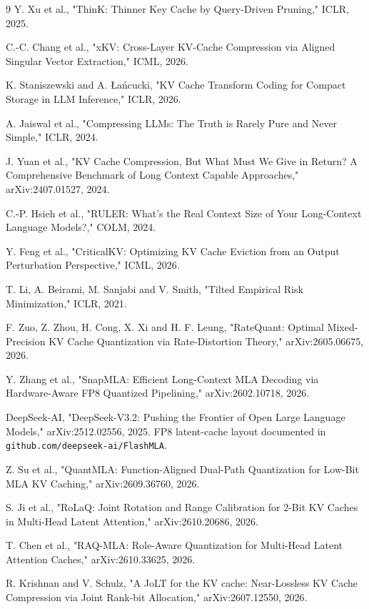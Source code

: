 \documentclass[10pt]{article}
\begin{document}
\begin{thebibliography}{9}
 Y. Xu et al., "ThinK: Thinner Key Cache by Query-Driven Pruning," ICLR, 2025.

 C.-C. Chang et al., "xKV: Cross-Layer KV-Cache Compression via Aligned Singular Vector Extraction," ICML, 2026.

 K. Staniszewski and A. Łańcucki, "KV Cache Transform Coding for Compact Storage in LLM Inference," ICLR, 2026.

 A. Jaiswal et al., "Compressing LLMs: The Truth is Rarely Pure and Never Simple," ICLR, 2024.

 J. Yuan et al., "KV Cache Compression, But What Must We Give in Return? A Comprehensive Benchmark of Long Context Capable Approaches," arXiv:2407.01527, 2024.

 C.-P. Hsieh et al., "RULER: What's the Real Context Size of Your Long-Context Language Models?," COLM, 2024.

 Y. Feng et al., "CriticalKV: Optimizing KV Cache Eviction from an Output Perturbation Perspective," ICML, 2026.

 T. Li, A. Beirami, M. Sanjabi and V. Smith, "Tilted Empirical Risk Minimization," ICLR, 2021.

 F. Zuo, Z. Zhou, H. Cong, X. Xi and H. F. Leung, "RateQuant: Optimal Mixed-Precision KV Cache Quantization via Rate-Distortion Theory," arXiv:2605.06675, 2026.

 Y. Zhang et al., "SnapMLA: Efficient Long-Context MLA Decoding via Hardware-Aware FP8 Quantized Pipelining," arXiv:2602.10718, 2026.

 DeepSeek-AI, "DeepSeek-V3.2: Pushing the Frontier of Open Large Language Models," arXiv:2512.02556, 2025. FP8 latent-cache layout documented in \texttt{github.com/\allowbreak deepseek-ai/\allowbreak FlashMLA}.

 Z. Su et al., "QuantMLA: Function-Aligned Dual-Path Quantization for Low-Bit MLA KV Caching," arXiv:2609.36760, 2026.

 S. Ji et al., "RoLaQ: Joint Rotation and Range Calibration for 2-Bit KV Caches in Multi-Head Latent Attention," arXiv:2610.20686, 2026.

 T. Chen et al., "RAQ-MLA: Role-Aware Quantization for Multi-Head Latent Attention Caches," arXiv:2610.33625, 2026.

 R. Krishnan and V. Schulz, "A JoLT for the KV cache: Near-Lossless KV Cache Compression via Joint Rank-bit Allocation," arXiv:2607.12550, 2026.


\end{thebibliography}
\end{document}
